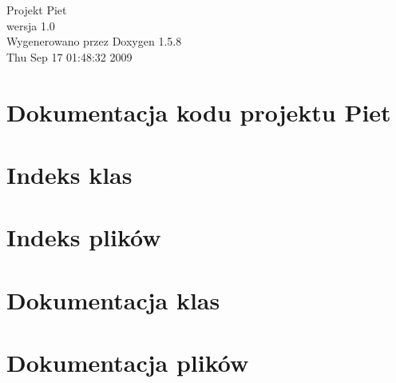\documentclass[a4paper]{book}
\begin{document}
\begin{titlepage}
\vspace*{7cm}
\begin{center}
{\Large Projekt Piet \\[1ex]\large wersja 1.0 }\\
\vspace*{1cm}
{\large Wygenerowano przez Doxygen 1.5.8}\\
\vspace*{0.5cm}
{\small Thu Sep 17 01:48:32 2009}\\
\end{center}
\end{titlepage}
\clearemptydoublepage
{}
\tableofcontents
\clearemptydoublepage
{}
\chapter{Dokumentacja kodu projektu Piet}
\label{index}\hypertarget{index}{}
\chapter{Indeks klas}

\chapter{Indeks plików}

\chapter{Dokumentacja klas}






\chapter{Dokumentacja plików}
















\printindex
\end{document}
